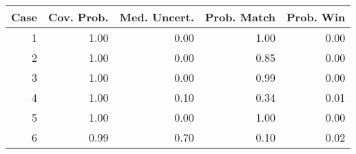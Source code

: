 \begin{tabular}{|r|rrrr|}
  \hline
Case & Cov. Prob. & Med. Uncert. & Prob. Match & Prob. Win \\ 
  \hline
1 & 1.00 & 0.00 & 1.00 & 0.00 \\ 
  2 & 1.00 & 0.00 & 0.85 & 0.00 \\ 
  3 & 1.00 & 0.00 & 0.99 & 0.00 \\ 
  4 & 1.00 & 0.10 & 0.34 & 0.01 \\ 
  5 & 1.00 & 0.00 & 1.00 & 0.00 \\ 
  6 & 0.99 & 0.70 & 0.10 & 0.02 \\ 
   \hline
\end{tabular}
